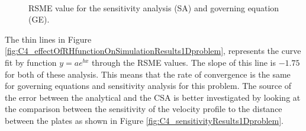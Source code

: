 \begin{figure}[H]
    \centering
    \\
    \caption{RSME value for the sensitivity analysis (SA) and governing equation (GE).}
    \label{fig:C4_effectOfNumberOfNodesOnSensitivityResults1Dproblem}
\end{figure}

The thin lines in Figure \ref{fig:C4_effectOfRHfunctionOnSimulationResults1Dproblem}, represents the curve fit by function $y = ae^{bx}$ through the RSME values. The slope of this line is $-1.75$ for both of these analysis. This means that the rate of convergence is the same for governing equations and sensitivity analysis for this problem. The source of the error between the analytical and the CSA is better investigated by looking at the comparison between the sensitivity of the velocity profile to the distance between the plates as shown in Figure \ref{fig:C4_sensitivityResults1Dproblem}.

